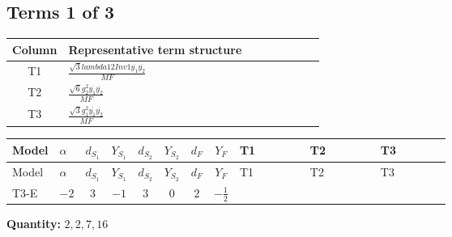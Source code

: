 \documentclass[8pt]{article}
\begin{document}
\begin{landscape}
\subsection*{Terms 1 of 3}
\begin{center}
\begin{tabular}{@{}c >{\raggedright\arraybackslash}p{0.82\linewidth}@{}}
\toprule
Column & Representative term structure \\
\midrule
T1 & \(\displaystyle \frac{\sqrt{3} lambda12Inv1 \overline{y_{1}} \overline{y_{2}}}{MF}\) \\
\midrule
T2 & \(\displaystyle \frac{\sqrt{6} g_{2}^{2} \overline{y_{1}} \overline{y_{2}}}{MF}\) \\
\midrule
T3 & \(\displaystyle \frac{\sqrt{3} g_{1}^{2} \overline{y_{1}} \overline{y_{2}}}{MF}\) \\
\midrule
\bottomrule
\end{tabular}
\end{center}
\smallskip
\tiny
\begin{longtable}{@{}llcccccc >{\raggedright\arraybackslash}p{0.21\linewidth} >{\raggedright\arraybackslash}p{0.21\linewidth} >{\raggedright\arraybackslash}p{0.21\linewidth}@{}}
\toprule
Model & $\alpha$ & $d_{S_1}$ & $Y_{S_1}$ & $d_{S_2}$ & $Y_{S_2}$ & $d_F$ & $Y_F$ & T1 & T2 & T3 \\
\midrule
\endfirsthead
\toprule
Model & $\alpha$ & $d_{S_1}$ & $Y_{S_1}$ & $d_{S_2}$ & $Y_{S_2}$ & $d_F$ & $Y_F$ & T1 & T2 & T3 \\
\midrule
\endhead
T3-E & $-2$ & $3$ & $-1$ & $3$ & $0$ & $2$ & $-\frac{1}{2}$ & \scriptsize\adjustbox{max width=\linewidth}{$\begin{gathered} - \frac{\sqrt{3} lambda12Inv1 \overline{y_{1}} \overline{y_{2}}}{6 MF}\end{gathered}$} & \scriptsize\adjustbox{max width=\linewidth}{$\begin{gathered} \frac{\sqrt{6} g_{2}^{2} \overline{y_{1}} \overline{y_{2}}}{3 MF}\end{gathered}$} & \scriptsize\adjustbox{max width=\linewidth}{$\begin{gathered} \frac{\sqrt{3} g_{1}^{2} \overline{y_{1}} \overline{y_{2}}}{8 MF}\end{gathered}$} \\
\midrule
\bottomrule
\end{longtable}
\clearpage
\noindent\textbf{Quantity: }$\mathrm{2,2,7,16}$\par\smallskip

\end{landscape}
\end{document}
